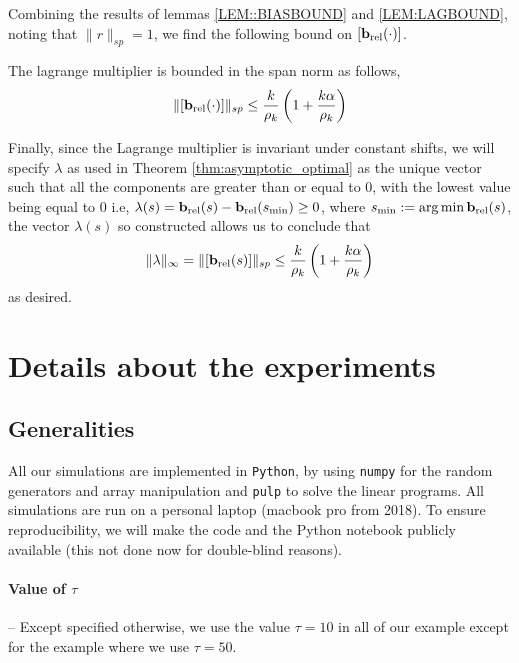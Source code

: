 Combining the results of lemmas \ref{LEM::BIASBOUND} and \ref{LEM:LAGBOUND}, noting that $ \|r\|_{sp} = 1$, we find the following bound on $[\mathbf{b}_{\text{rel}}(\cdot)]$.

\begin{corollary}
    The lagrange multiplier is bounded in the span norm as follows,
    \begin{equation}
        \|[\mathbf{b}_{\text{rel}}(\cdot)]\|_{sp} \leq \frac{k }{\rho_{k}}\left(1 + \frac{k \alpha}{\rho_{k}} \right)
    \end{equation}
\end{corollary}
 Finally, since the Lagrange multiplier is invariant under constant shifts, we will specify $\lambda$ as used in Theorem \ref{thm:asymptotic_optimal} as the unique vector such that all the components are greater than or equal to $0$, with the lowest value being equal to $0$ i.e, $\lambda(s) = \mathbf{b}_{\text{rel}}(s) - \mathbf{b}_{\text{rel}}(s_{\text{min}}) \geq 0$, where $s_{\text{min}} := \arg\min \mathbf{b}_{\text{rel}}(s)$, the vector $\lambda (s)$ so constructed allows us to conclude that 
 \[
 \|\lambda\|_{\infty} = \|[\mathbf{b}_{\text{rel}}(s)]\|_{sp} \leq \frac{k }{\rho_{k}}\left(1 + \frac{k \alpha}{\rho_{k}} \right)
 \]
as desired. 

\section{Details about the experiments}
\label{apx:parameters}

\subsection{Generalities}

All our simulations are implemented in \texttt{Python}, by using \texttt{numpy} for the random generators and array manipulation and \texttt{pulp} to solve the linear programs. All simulations are run on a personal laptop (macbook pro from 2018). To ensure reproducibility, we will make the code and the Python notebook publicly available (this not done now for double-blind reasons). 

\paragraph{Value of $\tau$} -- Except specified otherwise, we use the value $\tau=10$ in all of our example except for the example \cite{chen:tel-04068056} where we use $\tau=50$.

